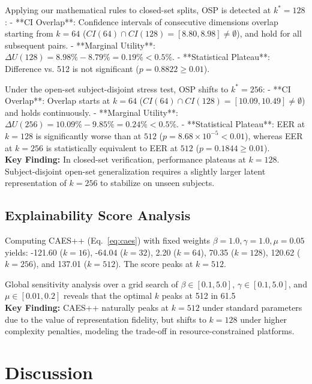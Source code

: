 \documentclass[conference]{IEEEtran}
\begin{document}
Applying our mathematical rules to closed-set splits, OSP is detected at $k^*=128$:
- **CI Overlap**: Confidence intervals of consecutive dimensions overlap starting from $k=64$ ($CI(64) \cap CI(128) = [8.80, 8.98] \neq \emptyset$), and hold for all subsequent pairs.
- **Marginal Utility**: $\Delta U(128) = 8.98\% - 8.79\% = 0.19\% < 0.5\%$.
- **Statistical Plateau**: Difference vs. 512 is not significant ($p = 0.8822 \ge 0.01$).

Under the open-set subject-disjoint stress test, OSP shifts to $k^*=256$:
- **CI Overlap**: Overlap starts at $k=64$ ($CI(64) \cap CI(128) = [10.09, 10.49] \neq \emptyset$) and holds continuously.
- **Marginal Utility**: $\Delta U(256) = 10.09\% - 9.85\% = 0.24\% < 0.5\%$.
- **Statistical Plateau**: EER at $k=128$ is significantly worse than at $512$ ($p = 8.68 \times 10^{-5} < 0.01$), whereas EER at $k=256$ is statistically equivalent to EER at $512$ ($p = 0.1844 \ge 0.01$).
\\
\textbf{Key Finding:} In closed-set verification, performance plateaus at $k=128$. Subject-disjoint open-set generalization requires a slightly larger latent representation of $k=256$ to stabilize on unseen subjects.

\subsection{Explainability Score Analysis}
Computing CAES++ (Eq.~\ref{eq:caes}) with fixed weights $\beta=1.0, \gamma=1.0, \mu=0.05$ yields: -121.60 ($k{=}16$), -64.04 ($k{=}32$), 2.20 ($k{=}64$), 70.35 ($k{=}128$), 120.62 ($k{=}256$), and 137.01 ($k{=}512$). The score peaks at $k=512$. 

Global sensitivity analysis over a grid search of $\beta \in [0.1, 5.0]$, $\gamma \in [0.1, 5.0]$, and $\mu \in [0.01, 0.2]$ reveals that the optimal $k$ peaks at 512 in 61.5%
\\
\textbf{Key Finding:} CAES++ naturally peaks at $k=512$ under standard parameters due to the value of representation fidelity, but shifts to $k=128$ under higher complexity penalties, modeling the trade-off in resource-constrained platforms.

\section{Discussion}
\label{sec:discussion}
\end{document}
